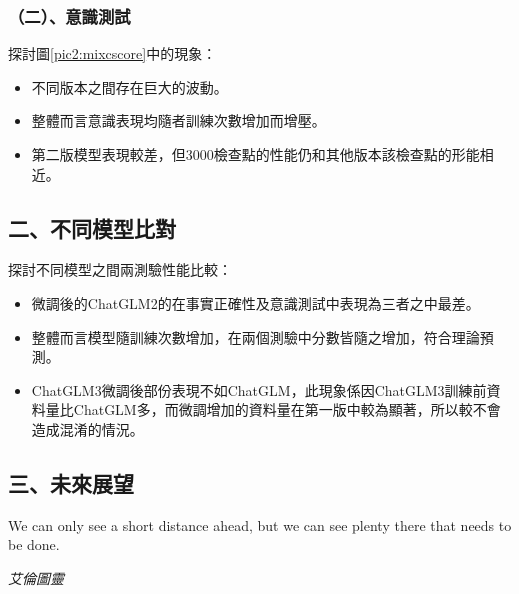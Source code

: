 \documentclass[12pt,a4paper,MingLiU,UTF8,natbib]{article}
\begin{document}
	\subsubsection{（二）、意識測試}
	探討圖\ref{pic2:mixcscore}中的現象：
	
	\begin{itemize}
		\item 不同版本之間存在巨大的波動。
		\item 整體而言意識表現均隨者訓練次數增加而增壓。
		\item 第二版模型表現較差，但3000檢查點的性能仍和其他版本該檢查點的形能相近。
	\end{itemize}
	
	
	\subsection{二、不同模型比對}
	探討不同模型之間兩測驗性能比較：
	
	\begin{itemize}
		\item 微調後的ChatGLM2的在事實正確性及意識測試中表現為三者之中最差。
		\item 整體而言模型隨訓練次數增加，在兩個測驗中分數皆隨之增加，符合理論預測。
		\item ChatGLM3微調後部份表現不如ChatGLM，此現象係因ChatGLM3訓練前資料量比ChatGLM多，而微調增加的資料量在第一版中較為顯著，所以較不會造成混淆的情況。
	\end{itemize}
	
	\subsection{三、未來展望}
	\epigraph{	We can only see a short distance ahead, but we can see plenty there that needs to be done.}{\textit{艾倫圖靈}}
\end{document}

